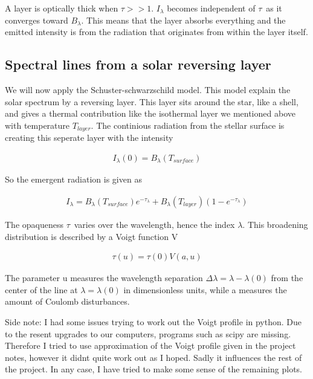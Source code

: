 \documentclass[norsk,a4paper,12pt]{article}
\begin{document}
A layer is optically thick when $\tau>>1 $. $I_{\lambda} $  becomes independent of $\tau$ as it converges toward  
$B_{\lambda} $. This means that the layer absorbs everything and the emitted intensity is from the radiation that 
originates from within the layer itself. 

\subsection{Spectral lines from a solar reversing layer}
We will now apply the Schuster-schwarzschild model. This model explain the solar spectrum by a reversing layer. 
This layer sits around the star, like a shell, and gives a thermal contribution like the isothermal layer we 
mentioned above with temperature $T_{layer} $. The continious radiation from the stellar surface is creating this seperate layer with the 
intensity 

\begin{align*}
I_{\lambda}(0) = B_{\lambda}(T_{surface})
\end{align*} 

So the emergent radiation is given as

\begin{align*}
I_{\lambda} = B_{\lambda}(T_{surface})e^{-\tau_{\lambda}} + B_{\lambda}(T_{layer})(1 - e^{-\tau_{\lambda}})
\end{align*} 

The opaqueness $\tau $ varies over the wavelength, hence the index $\lambda $. This broadening distribution 
is described by a Voigt function V

\begin{align*}
\tau(u) = \tau(0)V(a,u)
\end{align*} 

The parameter u measures the wavelength separation $\Delta\lambda = \lambda - \lambda(0) $ from the center of
the line at $\lambda = \lambda(0) $ in dimensionless units, while a measures the amount of Coulomb disturbances.

Side note: I had some issues trying to work out the Voigt profile in python. Due to the resent upgrades to our computers, 
programs such as scipy are missing. Therefore I tried to use approximation of the Voigt profile given in the 
project notes, however it didnt quite work out as I hoped. Sadly it influences the rest of the project. 
In any case, I have tried to make some sense of the remaining plots.
\end{document}

